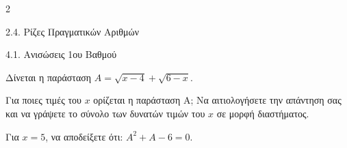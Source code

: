 \begin{ylh}{2}
    \item 2.4. Ρίζες Πραγματικών Αριθμών
    \item 4.1. Ανισώσεις 1ου Βαθμού
\end{ylh}
Δίνεται η παράσταση $A = \sqrt{x - 4} + \sqrt{6 - x}$.

\begin{alist}
\item Για ποιες τιμές του $x$ ορίζεται η παράσταση Α; Να αιτιολογήσετε την απάντηση σας και να γράψετε το σύνολο των δυνατών τιμών του $x$ σε μορφή διαστήματος.
\item Για $x = 5$, να αποδείξετε ότι: $A^2 + A - 6 = 0$.
\end{alist}

